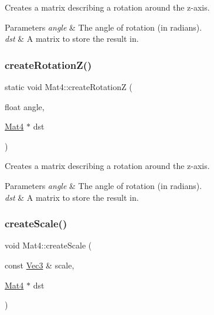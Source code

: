 Creates a matrix describing a rotation around the z-\/axis.


\begin{DoxyParams}{Parameters}
{\em angle} & The angle of rotation (in radians). \\
\hline
{\em dst} & A matrix to store the result in. \\
\hline
\end{DoxyParams}
\mbox{\label{classMat4_a4f07014344c83a3d502b5ec7422cd244}} 
\subsubsection{\texorpdfstring{create\+Rotation\+Z()}{createRotationZ()}\hspace{0.1cm}{\footnotesize\ttfamily [2/2]}}
{\footnotesize\ttfamily static void Mat4\+::create\+RotationZ (\begin{DoxyParamCaption}\item[{float}]{angle,  }\item[{\hyperlink{classMat4}{Mat4} $\ast$}]{dst }\end{DoxyParamCaption})\hspace{0.3cm}{\ttfamily [static]}}

Creates a matrix describing a rotation around the z-\/axis.


\begin{DoxyParams}{Parameters}
{\em angle} & The angle of rotation (in radians). \\
\hline
{\em dst} & A matrix to store the result in. \\
\hline
\end{DoxyParams}
\mbox{\label{classMat4_a82cdf950af1c6f514c61efa42787d9c0}} 
\subsubsection{\texorpdfstring{create\+Scale()}{createScale()}\hspace{0.1cm}{\footnotesize\ttfamily [1/4]}}
{\footnotesize\ttfamily void Mat4\+::create\+Scale (\begin{DoxyParamCaption}\item[{const \hyperlink{classVec3}{Vec3} \&}]{scale,  }\item[{\hyperlink{classMat4}{Mat4} $\ast$}]{dst }\end{DoxyParamCaption})\hspace{0.3cm}{\ttfamily [static]}}

